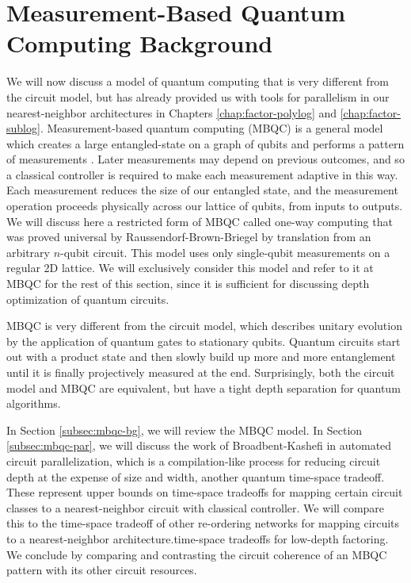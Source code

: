 \section{Measurement-Based Quantum Computing Background}
\label{sec:cohere-mbqc}

We will now discuss a model of quantum computing that is very different
from the circuit model, but has already provided us with tools for
parallelism in our nearest-neighbor architectures 
in Chapters \ref{chap:factor-polylog} and \ref{chap:factor-sublog}.
Measurement-based quantum computing (MBQC) is a general model which creates
a large entangled-state on a graph of qubits and performs a pattern of
measurements \cite{Raussendorf2001}.
Later measurements may depend on previous outcomes, and so
a classical controller is required to make each measurement adaptive in this
way. Each measurement reduces the size of our entangled state, and the
measurement operation proceeds
physically across our lattice of qubits, from inputs to outputs.
We will discuss here a restricted form of MBQC called one-way computing
that was proved universal by Raussendorf-Brown-Briegel \cite{Raussendorf2003}
by translation from an arbitrary $n$-qubit circuit.
This model uses only single-qubit measurements on a
regular 2D lattice. We will exclusively consider this model and refer to it
at MBQC for the rest of this section, since it is sufficient for discussing
depth optimization of quantum circuits.

MBQC is very different from the circuit model, which describes unitary
evolution by the application of quantum gates to stationary qubits.
Quantum circuits start out with a product state and then slowly build up
more and more entanglement until it is finally projectively measured at the
end. Surprisingly, both the circuit model and MBQC are equivalent, but
have a tight depth separation for quantum algorithms.

In Section \ref{subsec:mbqc-bg}, we will review the MBQC model.
In Section \ref{subsec:mbqc-par}, we will discuss the work of
Broadbent-Kashefi in automated circuit parallelization, which is a
compilation-like process for reducing circuit depth at the expense of
size and width, another quantum time-space tradeoff. These represent
upper bounds on time-space tradeoffs for mapping certain circuit classes
to a nearest-neighbor circuit with classical controller. We will compare this
to the time-space tradeoff of
other re-ordering networks for mapping circuits to a nearest-neighbor
architecture.time-space tradeoffs for low-depth factoring.
We conclude by comparing and contrasting the
circuit coherence of an MBQC pattern with its other circuit resources.

